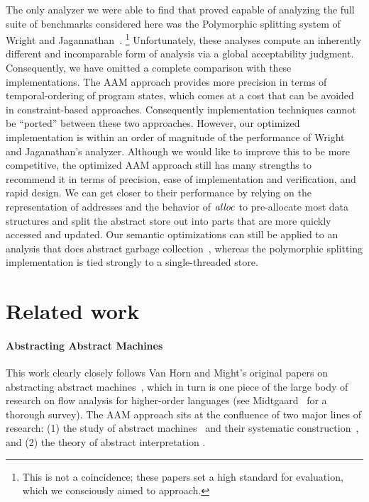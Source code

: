 \documentclass[9pt]{sigplanconf} %
\begin{document}
The only analyzer we were able to find that proved capable of analyzing the full suite of benchmarks considered here
was the Polymorphic splitting system of Wright and Jagannathan~\cite{dvanhorn:wright-jagannathan-toplas98}.
%
\footnote{This is not a coincidence; these papers set a high standard for evaluation, which we consciously aimed to approach.}
%
Unfortunately, these analyses compute an inherently different and incomparable form of analysis via a global acceptability judgment.
%
Consequently, we have omitted a complete comparison with these implementations.
%
The AAM approach provides more precision in terms of temporal-ordering of program states, which comes at a cost that can be avoided in constraint-based approaches.
%
Consequently implementation techniques cannot be ``ported'' between these two approaches.
%
However, our optimized implementation is within an order of magnitude of the performance of Wright and Jaganathan's analyzer.
%
Although we would like to improve this to be more competitive, the optimized AAM approach still has many strengths to recommend it in terms of precision, ease of implementation and verification, and rapid design.
%
 We can get closer to their performance by relying on the representation of addresses and the behavior of $\mathit{alloc}$ to pre-allocate most data structures and split the abstract store out into parts that are more quickly accessed and updated.
%
Our semantic optimizations can still be applied to an analysis that does abstract garbage collection~\cite{dvanhorn:Might:2006:GammaCFA}, whereas the polymorphic splitting implementation is tied strongly to a single-threaded store.

\section{Related work}
\label{sec:related}

\paragraph{Abstracting Abstract Machines}

This work clearly closely follows Van Horn and Might's original papers on abstracting abstract machines~\cite{dvanhorn:VanHorn2011Abstracting,dvanhorn:VanHorn2012Systematic}, which in turn is one piece of the large body of research on flow analysis for higher-order languages (see Midtgaard~\cite{dvanhorn:Midtgaard2011Controlflow} for a thorough survey).
%
The AAM approach sits at the confluence of two major lines of research:
%
(1) the study of abstract machines~\cite{dvanhorn:landin-64} and their systematic construction~\cite{dvanhorn:reynolds-hosc98},
%
and (2) the theory of abstract interpretation \cite{dvanhorn:Cousot:1977:AI,dvanhorn:Cousot1979Systematic}.
\end{document}
